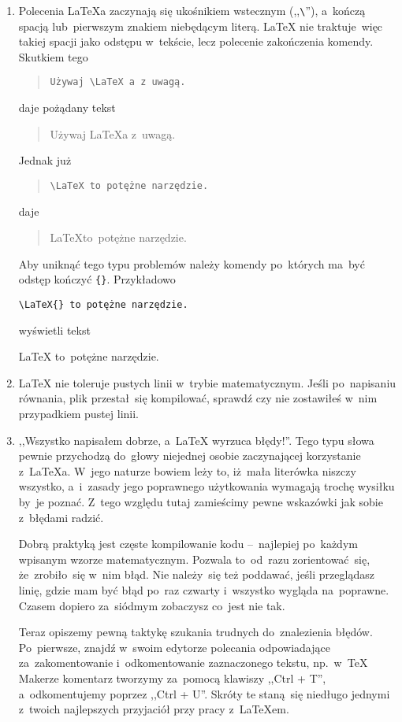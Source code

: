 \documentclass[a4paper,11pt]{article}
\newcommand{\tbs}{\textbackslash}  %
\begin{document}
\begin{enumerate}
\item Polecenia \LaTeX a zaczynają się ukośnikiem wstecznym
  (,,\texttt{\tbs}''), a~kończą spacją lub~pierwszym znakiem
  niebędącym literą. \LaTeX{} nie traktuje~więc takiej spacji jako
  odstępu w~tekście, lecz polecenie zakończenia komendy. Skutkiem tego
  \begin{quote}
    \texttt{Używaj \tbs LaTeX a z~uwagą.}
  \end{quote}
  daje pożądany tekst
  \begin{quote}
    Używaj \LaTeX a z~uwagą.
  \end{quote}
  Jednak już
  \begin{quote}
    \texttt{\tbs LaTeX to~potężne narzędzie.}
  \end{quote}
  daje
  \begin{quote}
    \LaTeX to~potężne narzędzie.
  \end{quote}
  Aby uniknąć tego typu problemów należy komendy po~których ma~być
  odstęp kończyć \texttt{\{\}}. Przykładowo
  \begin{displayquote}
    \texttt{\tbs LaTeX\{\} to~potężne narzędzie.}
  \end{displayquote}
  wyświetli tekst
  \begin{displayquote}
    \LaTeX{} to~potężne narzędzie.
  \end{displayquote}

\item \LaTeX{} nie toleruje pustych linii w~trybie matematycznym.
  Jeśli po~napisaniu równania, plik przestał~się kompilować, sprawdź
  czy nie zostawiłeś w~nim przypadkiem pustej linii.

\item ,,Wszystko napisałem dobrze, a~\LaTeX{} wyrzuca błędy!''. Tego
  typu słowa pewnie przychodzą do~głowy niejednej osobie zaczynającej
  korzystanie z~\LaTeX a. W~jego naturze bowiem leży to, iż~mała
  literówka niszczy wszystko, a~i~zasady jego poprawnego użytkowania
  wymagają trochę wysiłku by~je poznać. Z~tego względu tutaj
  zamieścimy pewne wskazówki jak sobie z~błędami radzić.

  Dobrą praktyką jest częste kompilowanie kodu --~najlepiej po~każdym
  wpisanym wzorze matematycznym. Pozwala to~od~razu zorientować~się,
  że~zrobiło~się w~nim błąd. Nie należy~się też poddawać, jeśli
  przeglądasz linię, gdzie mam być błąd po~raz czwarty i~wszystko
  wygląda na~poprawne. Czasem dopiero za~siódmym zobaczysz co~jest nie
  tak.

  Teraz opiszemy pewną taktykę szukania trudnych do~znalezienia
  błędów. Po~pierwsze, znajdź w~swoim edytorze polecania odpowiadające
  za~zakomentowanie i~odkomentowanie zaznaczonego tekstu, np.~w~\TeX
  Makerze komentarz tworzymy za~pomocą klawiszy ,,Ctrl + T'',
  a~odkomentujemy poprzez ,,Ctrl + U''. Skróty te staną~się niedługo
  jednymi z~twoich najlepszych przyjaciół przy pracy z~\LaTeX em.


\end{enumerate}
\end{document}
